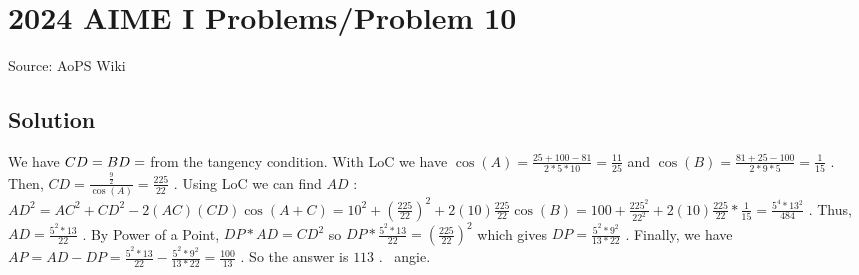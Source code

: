 \documentclass[12pt]{article}
\begin{document}
\section*{{2024 AIME I Problems/Problem 10}}
Source: AoPS Wiki

\subsection*{Solution}
We have $\let\angle BCD = \let\angle CBD = \let\angle A$ from the tangency condition. With LoC we have $\cos(A) = \frac{25+100-81}{2*5*10} = \frac{11}{25}$ and $\cos(B) = \frac{81+25-100}{2*9*5} = \frac{1}{15}$ . Then, $CD = \frac{\frac{9}{2}}{\cos(A)} = \frac{225}{22}$ . Using LoC we can find $AD$ : $AD^2 = AC^2 + CD^2 - 2(AC)(CD)\cos(A+C) = 10^2+(\frac{225}{22})^2 + 2(10)\frac{225}{22}\cos(B) = 100 + \frac{225^2}{22^2} + 2(10)\frac{225}{22}*\frac{1}{15} = \frac{5^4*13^2}{484}$ . Thus, $AD = \frac{5^2*13}{22}$ . By Power of a Point, $DP*AD = CD^2$ so $DP*\frac{5^2*13}{22} = (\frac{225}{22})^2$ which gives $DP = \frac{5^2*9^2}{13*22}$ . Finally, we have $AP = AD - DP = \frac{5^2*13}{22} - \frac{5^2*9^2}{13*22} = \frac{100}{13}$ . So the answer is $\boxed{113}$ . ~angie.
\end{document}
